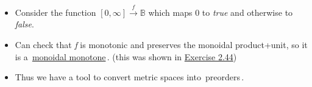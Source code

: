 \begin{itemize}
    \item Consider the function $[0,\infty] \xrightarrow{f} \mathbb{B}$ which maps 0 to \emph{true} and otherwise to \emph{false}.
    \item Can check that \emph{f} is monotonic and preserves the monoidal product+unit, so it is a \,\hyperref[D2.41]{monoidal monotone}\,. (this was shown in \hyperref[E2.44]{Exercise 2.44})
    \item Thus we have a tool to convert metric spaces into \,preorders\,.
  \end{itemize}